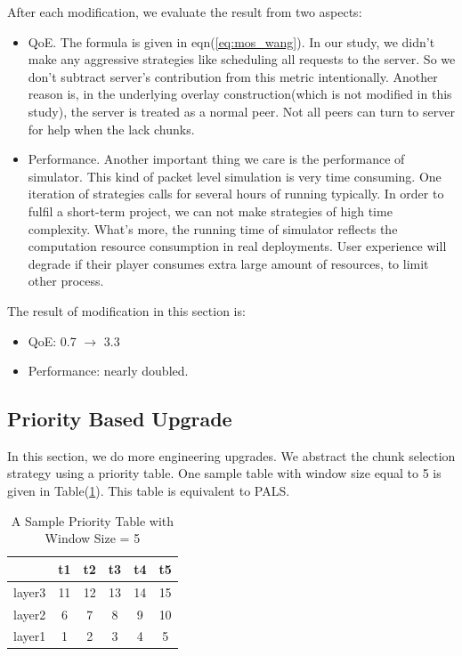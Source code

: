 \documentclass[11pt,a4paper]{article}
\begin{document}
After each modification, we evaluate the result from two aspects:
\begin{itemize}
	\item QoE. The formula is given in eqn(\ref{eq:mos_wang}). 
	In our study, we didn't make any aggressive strategies like
	scheduling all requests to the server. So we don't subtract server's
	contribution from this metric intentionally. Another reason is, 
	in the underlying overlay construction(which is not modified in 
	this study), the server is treated as a normal peer. Not all peers
	can turn to server for help when the lack chunks. 
	\item Performance. Another important thing we care is the performance
	of simulator. This kind of packet level simulation is very time consuming. 
	One iteration of strategies calls for several hours of running typically. 
	In order to fulfil a short-term project, we can not make strategies of 
	high time complexity. What's more, the running time of simulator 
	reflects the computation resource consumption in real deployments. 
	User experience will degrade if their player consumes extra large
	amount of resources, to limit other process. 
\end{itemize}

The result of modification in this section is:
\begin{itemize}
	\item QoE: 0.7 $\rightarrow$ 3.3
	\item Performance: nearly doubled. 
\end{itemize}


\subsection{Priority Based Upgrade}
\label{sec:priority}

In this section, we do more engineering upgrades. 
We abstract the chunk selection strategy using a priority table. 
One sample table with window size equal to 5 is given in 
Table(\ref{tbl:sample_priority}). This table is equivalent to 
PALS. 

\begin{table}[htb]
\centering
\caption{A Sample Priority Table with Window Size = 5}
\label{tbl:sample_priority}
	\begin{tabular}{|c|ccccc|}
	\hline
	 & t1 & t2 & t3 & t4 & t5 \\
	 \hline
	layer3 & 11 & 12 & 13 & 14 & 15 \\
	layer2 & 6 & 7 & 8 & 9 & 10 \\
	layer1 & 1 & 2 & 3 & 4 & 5 \\
	\hline
	\end{tabular}
\end{table}
\end{document}
